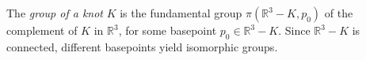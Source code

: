 The \textit{group of a knot} $K$ is the fundamental group $\pi(\mathbb{R}^3 - K, p_0)$ of the complement of $K$ in $\mathbb{R}^3$, for some basepoint $p_0 \in \mathbb{R}^3 - K$. Since $\mathbb{R}^3 - K$ is connected, different basepoints yield isomorphic groups.
